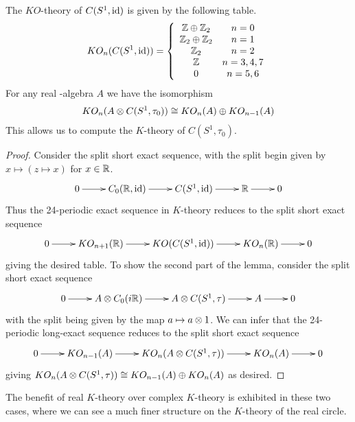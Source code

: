 \begin{theorem}\label{ktheorys1}
	The $KO$-theory of $C(S^1,\operatorname{id})$ is given by the following table. 
	\begin{align*}
		KO_n(C(S^1,\operatorname{id}))=\left \{ \begin{array}{c c} \mathbb{Z}\oplus \mathbb{Z}_2 & n=0 \\ \mathbb{Z}_2\oplus \mathbb{Z}_2 & n=1 \\ \mathbb{Z}_2 & n=2 \\ \mathbb{Z} & n=3,4,7 \\ 0 & n=5,6 \end{array} \right .
	\end{align*}
	For any real \Cstar-algebra $A$ we have the isomorphism 
	\begin{align*}
		KO_n(A\otimes C(S^1,\tau_0))\cong KO_n(A)\oplus KO_{n-1}(A)
	\end{align*}
	This allows us to compute the $K$-theory of $C(S^1,\tau_0)$.
\end{theorem}
\begin{proof}
	Consider the split short exact sequence, with the split begin given by $x \mapsto (z\mapsto x)$ for $x\in \mathbb{R}$. 
	\begin{align*}
		\xymatrix{
			0\ar[r] & C_0(\R,\id) \ar[r] & C(S^1,\id) \ar[r] & \R \ar[r] & 0 
		}
	\end{align*}
	Thus the 24-periodic exact sequence in $K$-theory reduces to the split short exact sequence 
	\begin{align*}
	\xymatrix{
		0 \ar[r] & KO_{n+1}(\R) \ar[r] & KO(C(S^1,\id)) \ar[r] & KO_n(\R) \ar[r] & 0
		}
	\end{align*}
	giving the desired table. To show the second part of the lemma, consider the split short exact sequence
	\begin{align*}
	\xymatrix{
		0\ar[r] & A\tens C_0(i\R) \ar[r] & A\tens C(S^1,\tau) \ar[r] & A \ar[r] & 0
		}
	\end{align*}
	with the split being given by the map $a\mapsto a\otimes 1$.
	We can infer that the 24-periodic long-exact sequence reduces to the split short exact sequence
	\begin{align*}
		\xymatrix{
			0\ar[r] & KO_{n-1}(A) \ar[r] & KO_n(A\tens C(S^1,\tau)) \ar[r] & KO_n(A) \ar[r] & 0
		}
	\end{align*}
	giving $KO_n(A\otimes C(S^1,\tau))\cong  KO_{n-1}(A)\oplus  KO_n(A)$ as desired. 
\end{proof}
The benefit of real $K$-theory over complex $K$-theory is exhibited in these two cases, where we can see a much finer structure on the $K$-theory of the real circle.

